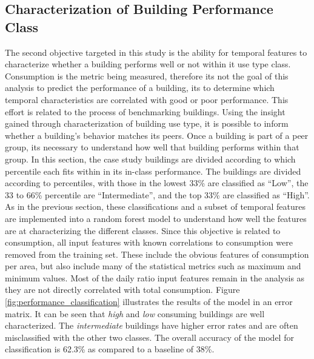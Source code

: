 \subsection{Characterization of Building Performance Class}
\label{sec:results_benchmarking}

The second objective targeted in this study is the ability for temporal features to characterize whether a building performs well or not within it use type class. Consumption is the metric being measured, therefore its not the goal of this analysis to predict the performance of a building, its to determine which temporal characteristics are correlated with good or poor performance. This effort is related to the process of benchmarking buildings. Using the insight gained through characterization of building use type, it is possible to inform whether a building's behavior matches its peers. Once a building is part of a peer group, its necessary to understand how well that building performs within that group. In this section, the case study buildings are divided according to which percentile each fits within in its in-class performance. The buildings are divided according to percentiles, with those in the lowest 33\% are classified as “Low”, the 33 to 66\% percentile are “Intermediate”, and the top 33\% are classified as “High”. As in the previous section, these classifications and a subset of temporal features are implemented into a random forest model to understand how well the features are at characterizing the different classes. Since this objective is related to consumption, all input features with known correlations to consumption were removed from the training set. These include the obvious features of consumption per area, but also include many of the statistical metrics such as maximum and minimum values. Most of the daily ratio input features remain in the analysis as they are not directly correlated with total consumption. Figure \ref{fig:performance_classification} illustrates the results of the model in an error matrix. It can be seen that \emph{high} and \emph{low} consuming buildings are well characterized. The \emph{intermediate} buildings have higher error rates and are often misclassified with the other two classes. The overall accuracy of the model for classification is 62.3\% as compared to a baseline of 38\%.




